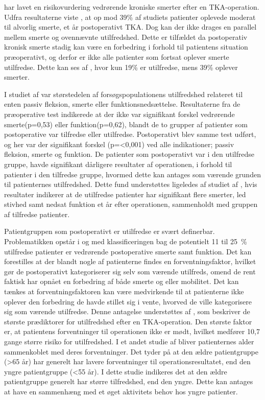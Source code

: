 \cite{Sakellariou2016} har lavet en risikovurdering vedrørende kroniske smerter efter en TKA-operation. Udfra resultaterne viste \cite{Sakellariou2016}, at op mod 39\% af studiets patienter oplevede moderat til alvorlig smerte, et år postoperativt TKA. Dog kan der ikke drages en parallel mellem smerte og ovennævnte utilfredshed. Dette er tilfældet da postoperativ kronisk smerte stadig kan være en forbedring i forhold til patientens situation præoperativt, og derfor er ikke alle patienter som fortsat oplever smerte utilfredse. Dette kan ses af \citep{skallariou2016}, hvor kun 19\% er utilfredse, mens 39\% oplever smerter.\citep{Sakellariou2016} 

I studiet af \cite{Jacobs2014} var størstedelen af forsøgspopulationens utilfredshed relateret til enten passiv fleksion, smerte eller funktionsnedsættelse. Resultaterne fra de præoperative test indikerede at der ikke var signifikant forskel vedrørende smerte(p=0,53) eller funktion(p=0,62), blandt de to grupper af patienter som postoperative var tilfredse eller utilfredse. Postoperativt blev samme test udført, og her var der signifikant forskel (p=<0,001) ved alle indikationer; passiv fleksion, smerte og funktion. 
De patienter som postoperativt var i den utilfredse gruppe, havde signifikant dårligere resultater af operationen, i forhold til patienter i den tilfredse gruppe, hvormed dette kan antages som værende grunden til patienternes utilfredshed. \citep{Jacobs2014} 
Dette fund understøttes ligeledes af studiet af \cite{Bourne2010}, hvis resultater indikerer at de utilfredse patienter har signifikant flere smerter, led stivhed samt nedsat funktion et år efter operationen, sammenholdt med gruppen af tilfredse patienter. \citep{Bourne2010}

Patientgruppen som postoperativt er utilfredse er svært definerbar. Problematikken opstår i og med klassificeringen bag de potentielt 11 til 25~\% utilfredse patienter er vedrørende postoperative smerte samt funktion. Det kan forestilles at der blandt nogle af patienterne findes en forventningsfaktor, hvilket gør de postoperativt kategoriserer sig selv som værende utilfreds, omend de rent faktisk har opnået en forbedring af både smerte og eller mobilitet. Det kan tænkes at forventningsfaktoren kan være medvirkende til at patienterne ikke oplever den forbedring de havde stillet sig i vente, hvorved de ville kategorisere sig som værende utilfredse. Denne antagelse understøttes af \cite{Bourne2010}, som beskriver de største prædiktorer for utilfredshed efter en TKA-operation. Den største faktor er, at patientens forventninger til operationen ikke er mødt, hvilket medfører 10,7 gange større risiko for utilfredshed. \citep{Bourne2010} I et andet studie af \cite{Keudell2013} bliver patienternes alder sammenkoblet med deres forventninger. Det tyder på at den ældre patientgruppe (>65 år) har generelt har lavere forventninger til operationsresultatet, end den yngre patientgruppe (<55 år). I dette studie indikeres det at den ældre patientgruppe generelt har større tilfredshed, end den yngre.\cite{Bourne2010} Dette kan antages at have en sammenhæng med et øget aktivitets behov hos yngre patienter. 

